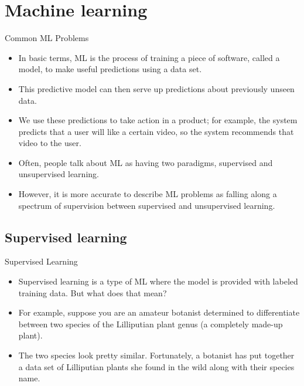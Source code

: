 \documentclass{beamer}
\begin{document}
%
%
%

\section{Machine learning}

\begin{frame}{Common ML Problems}

\begin{itemize}

\item In basic terms, ML is the process of training a piece of software, called a model, to make useful predictions using a data set. 

\item This predictive model can then serve up predictions about previously unseen data. 

\item We use these predictions to take action in a product; for example, the system predicts that a user will like a certain video, so the system recommends that video to the user.

\item Often, people talk about ML as having two paradigms, supervised and unsupervised learning. 

\item However, it is more accurate to describe ML problems as falling along a spectrum of supervision between supervised and unsupervised learning.
\end{itemize}

\end{frame}


\subsection{Supervised learning}

\begin{frame}{Supervised Learning}

\begin{itemize}
\item Supervised learning is a type of ML where the model is provided with labeled training data. But what does that mean?

\item For example, suppose you are an amateur botanist determined to differentiate between two species of the Lilliputian plant genus (a completely made-up plant). 

\item The two species look pretty similar. Fortunately, a botanist has put together a data set of Lilliputian plants she found in the wild along with their species name.

\end{itemize}

\end{frame}
\end{document}
